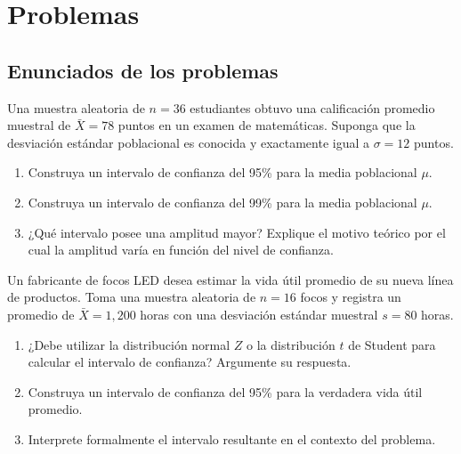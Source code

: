 \section*{Problemas}

\subsection*{Enunciados de los problemas}

\begin{problema}
	\label{prob:39c2251}
	Una muestra aleatoria de $n = 36$ estudiantes obtuvo una calificación promedio muestral de $\bar{X} = 78$ puntos en un examen de matemáticas. Suponga que la desviación estándar poblacional es conocida y exactamente igual a $\sigma = 12$ puntos.
	\begin{enumerate}
		\item Construya un intervalo de confianza del 95\% para la media poblacional $\mu$.
		\item Construya un intervalo de confianza del 99\% para la media poblacional $\mu$.
		\item ¿Qué intervalo posee una amplitud mayor? Explique el motivo teórico por el cual la amplitud varía en función del nivel de confianza.
	\end{enumerate}
\end{problema}

\begin{problema}
	\label{prob:8fd99c8}
	Un fabricante de focos LED desea estimar la vida útil promedio de su nueva línea de productos. Toma una muestra aleatoria de $n = 16$ focos y registra un promedio de $\bar{X} = 1,200$ horas con una desviación estándar muestral $s = 80$ horas.
	\begin{enumerate}
		\item ¿Debe utilizar la distribución normal $Z$ o la distribución $t$ de Student para calcular el intervalo de confianza? Argumente su respuesta.
		\item Construya un intervalo de confianza del 95\% para la verdadera vida útil promedio.
		\item Interprete formalmente el intervalo resultante en el contexto del problema.
	\end{enumerate}
\end{problema}

